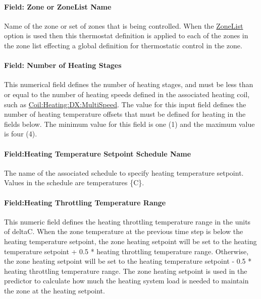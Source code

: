 \paragraph{Field: Zone or ZoneList Name}\label{field-zone-or-zonelist-name-1-001}

Name of the zone or set of zones that is being controlled. When the \hyperref[zonelist]{ZoneList} option is used then this thermostat definition is applied to each of the zones in the zone list effecting a global definition for thermostatic control in the zone.

\paragraph{Field: Number of Heating Stages}\label{field-number-of-heating-stages}

This numerical field defines the number of heating stages, and must be less than or equal to the number of heating speeds defined in the associated heating coil, such as \hyperref[coilheatingdxmultispeed]{Coil:Heating:DX:MultiSpeed}. The value for this input field defines the number of heating temperature offsets that must be defined for heating in the fields below. The minimum value for this field is one (1) and the maximum value is four (4).

\paragraph{Field:Heating Temperature Setpoint Schedule Name}\label{fieldheating-temperature-setpoint-schedule-name}

The name of the associated schedule to specify heating temperature setpoint. Values in the schedule are temperatures \{C\}.

\paragraph{Field:Heating Throttling Temperature Range}\label{fieldheating-throttling-temperature-range}

This numeric field defines the heating throttling temperature range in the units of deltaC. When the zone temperature at the previous time step is below the heating temperature setpoint, the zone heating setpoint will be set to the heating temperature setpoint + 0.5 * heating throttling temperature range. Otherwise, the zone heating setpoint will be set to the heating temperature setpoint - 0.5 * heating throttling temperature range. The zone heating setpoint is used in the predictor to calculate how much the heating system load is needed to maintain the zone at the heating setpoint.


